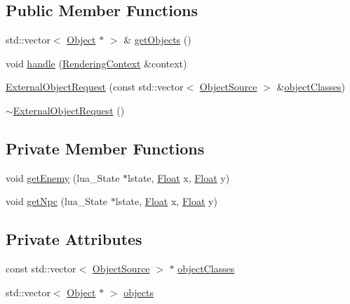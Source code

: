 \subsection*{Public Member Functions}
\begin{DoxyCompactItemize}
\item 
std\+::vector$<$ \hyperlink{classZeta_1_1Object}{Object} $\ast$ $>$ \& \hyperlink{classZeta_1_1ExternalObjectRequest_a7ff291816739593ca735b27366476ec4}{get\+Objects} ()
\item 
void \hyperlink{classZeta_1_1ExternalObjectRequest_afb1f3ec439ec7b858fd5bd4762f28971}{handle} (\hyperlink{classZeta_1_1RenderingContext}{Rendering\+Context} \&context)
\item 
\hyperlink{classZeta_1_1ExternalObjectRequest_a621d66932f822fe2c39c8d634b0745ec}{External\+Object\+Request} (const std\+::vector$<$ \hyperlink{structZeta_1_1ExternalObjectRequest_1_1ObjectSource}{Object\+Source} $>$ \&\hyperlink{classZeta_1_1ExternalObjectRequest_ab2a5b87e64de0bed5732e2741abc6ba6}{object\+Classes})
\item 
\hyperlink{classZeta_1_1ExternalObjectRequest_af8e83f60dc6805d7f511ba680e818cfb}{$\sim$\+External\+Object\+Request} ()
\end{DoxyCompactItemize}
\subsection*{Private Member Functions}
\begin{DoxyCompactItemize}
\item 
void \hyperlink{classZeta_1_1ExternalObjectRequest_a49e26c991546d03ad57da57189dc837e}{get\+Enemy} (lua\+\_\+\+State $\ast$lstate, \hyperlink{namespaceZeta_a1e0a1265f9b3bd3075fb0fabd39088ba}{Float} x, \hyperlink{namespaceZeta_a1e0a1265f9b3bd3075fb0fabd39088ba}{Float} y)
\item 
void \hyperlink{classZeta_1_1ExternalObjectRequest_adb70d23f8eb716cc9e1d9333c417b5bf}{get\+Npc} (lua\+\_\+\+State $\ast$lstate, \hyperlink{namespaceZeta_a1e0a1265f9b3bd3075fb0fabd39088ba}{Float} x, \hyperlink{namespaceZeta_a1e0a1265f9b3bd3075fb0fabd39088ba}{Float} y)
\end{DoxyCompactItemize}
\subsection*{Private Attributes}
\begin{DoxyCompactItemize}
\item 
const std\+::vector$<$ \hyperlink{structZeta_1_1ExternalObjectRequest_1_1ObjectSource}{Object\+Source} $>$ $\ast$ \hyperlink{classZeta_1_1ExternalObjectRequest_ab2a5b87e64de0bed5732e2741abc6ba6}{object\+Classes}
\item 
std\+::vector$<$ \hyperlink{classZeta_1_1Object}{Object} $\ast$ $>$ \hyperlink{classZeta_1_1ExternalObjectRequest_a983916469bdc42f289e71fda3c2dc506}{objects}
\end{DoxyCompactItemize}

